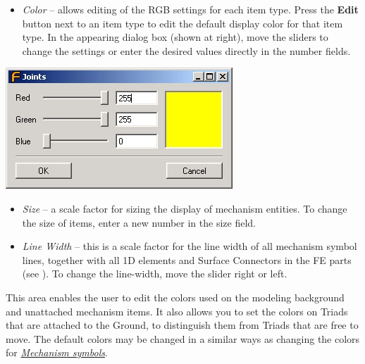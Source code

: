 \noindent
\begin{minipage}{0.6\textwidth}
  \raggedright
  \begin{itemize}
  \item{\sl Color} --
    allows editing of the RGB settings for each item type.
    Press the \textbf{Edit} button next to an item type to edit the default
    display color for that item type. In the appearing dialog box
    (shown at right), move the sliders to change the settings or enter
    the desired values directly in the number fields.
  \end{itemize}
\end{minipage}%
\begin{minipage}{0.4\textwidth}
  \raggedleft
  \includegraphics[scale=0.52]{Figures/Dialogs/2-Color}
\end{minipage}

\clearpage
\begin{itemize}
\item{\sl Size} --
  a scale factor for sizing the display of mechanism entities.
  To change the size of items, enter a new number in the size field.
\item{\sl Line Width} --
  this is a scale factor for the line width of all mechanism symbol lines,
  together with all 1D elements and Surface Connectors in the FE parts
  (see ).
  To change the line-width, move the slider right or left.
\end{itemize}


This area enables the user to edit the colors used on the modeling background
and unattached mechanism items. It also allows you to set the colors on Triads
that are attached to the Ground, to distinguish them from Triads that are free
to move. The default colors may be changed in a similar ways as changing the
colors for \protect\hyperlink{mechanism-symbols}{\sl Mechanism symbols}.

